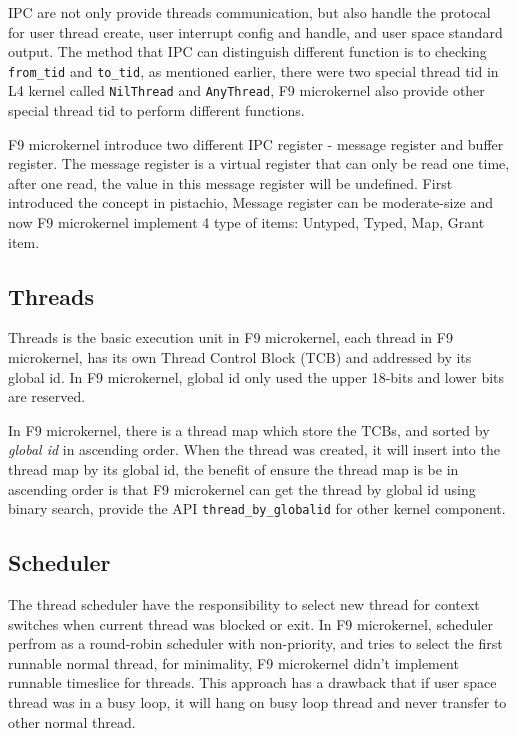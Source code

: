 \documentclass[10pt,preprint,nocopyrightspace]{sigplanconf}
\begin{document}
IPC are not only provide threads communication, but also handle the protocal for user thread create, user interrupt config and handle, and user space standard output. The method that IPC can distinguish different function is to checking \verb|from_tid| and \verb|to_tid|, as mentioned earlier, there were two special thread tid in L4 kernel  called \verb|NilThread| and \verb|AnyThread|, F9 microkernel also provide other special thread tid to perform different functions.

F9 microkernel introduce two different IPC register - message register and buffer register. The message register is a virtual register that can only be read one time, after one read, the value in this message register will be undefined. First introduced the concept in pistachio\cite{nourai2005aphysically}, Message register can be moderate-size and now F9 microkernel implement 4 type of items: Untyped, Typed, Map, Grant item.

\subsection{Threads}

Threads is the basic execution unit in F9 microkernel, each thread in F9 microkernel, has its own Thread Control Block (TCB) and addressed by its global id. In F9 microkernel, global id only used the upper 18-bits and lower bits are reserved.

In F9 microkernel, there is a thread map which store the TCBs, and sorted by \textit{global id} in ascending order. When the thread was created, it will insert into the thread map by its global id, the benefit of ensure the thread map is be in ascending order is that F9 microkernel can get the thread by global id using binary search, provide the API \verb|thread_by_globalid| for other kernel component.

\subsection{Scheduler}

The thread scheduler have the responsibility to select new thread for context switches when current thread was blocked or exit. In F9 microkernel, scheduler perfrom as a round-robin scheduler with non-priority, and tries to select the first runnable normal thread, for minimality, F9 microkernel didn't implement runnable timeslice for threads. This approach has a drawback that if user space thread was in a busy loop, it will hang on busy loop thread and never transfer to other normal thread.
\end{document}

